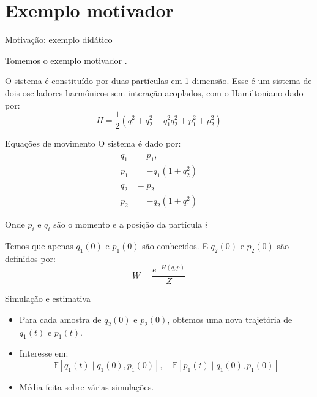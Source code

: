 \section{Exemplo motivador} %


\begin{frame}{Motivação: exemplo didático}
	
	Tomemos o exemplo motivador \cite{Chorin2013}.
	
	O sistema é constituído por duas partículas em 1 dimensão. Esse é um sistema de dois osciladores harmônicos sem interação acoplados, com o Hamiltoniano dado por:
	\begin{equation*}
		H = \frac{1}{2}\left(q_1^2 + q_2^2 + q_1^2 q_2^2 + p_1^2 + p_2^2\right)
	\end{equation*}
\end{frame}

\begin{frame}{Equações de movimento}
	O sistema é dado por:
	\begin{align*}
		\dot{q}_1 & = p_1,            \\
		\dot{p}_1 & = -q_1(1 + q_2^2) \\
		\dot{q}_2 & = p_2             \\
		\dot{p}_2 & = -q_2(1 + q_1^2) 
	\end{align*}
	
	\footnotesize{Onde $p_i$ e $q_i$ são o momento e a posição da partícula $i$}
	
	Temos que apenas $q_1(0)$ e $p_1(0)$ são conhecidos. E $q_2(0)$ e $p_2(0)$ são definidos por:
	\begin{equation*}
		W = \frac{e^{-H(q,p)}}{Z}
	\end{equation*}
	
\end{frame}


\begin{frame}{Simulação e estimativa}
	\begin{itemize}
		\item Para cada amostra de $q_2(0)$ e $p_2(0)$, obtemos uma nova trajetória de $q_1(t)$ e $p_1(t)$.
		\item Interesse em:
		      \begin{equation*}
		      	\mathbb{E}[q_1(t)\mid q_1(0), p_1(0)], \quad \mathbb{E}[p_1(t)\mid q_1(0), p_1(0)]
		      \end{equation*}
		\item Média feita sobre várias simulações.
	\end{itemize}
\end{frame}

